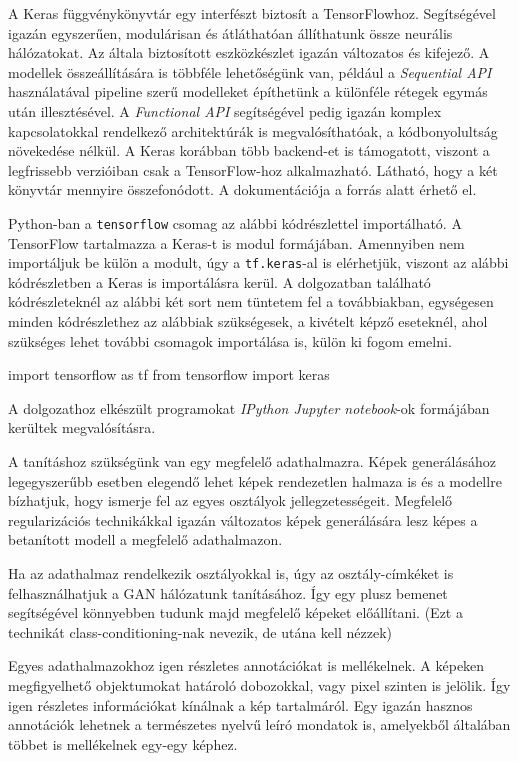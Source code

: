 A Keras függvénykönyvtár egy interfészt biztosít a TensorFlowhoz. Segítségével igazán egyszerűen, modulárisan és átláthatóan állíthatunk össze neurális hálózatokat. Az általa biztosított eszközkészlet igazán változatos és kifejező. A modellek összeállítására is többféle lehetőségünk van, például a \textit{Sequential API} használatával pipeline szerű modelleket építhetünk a különféle rétegek egymás után illesztésével. A \textit{Functional API} segítségével pedig igazán komplex kapcsolatokkal rendelkező architektúrák is megvalósíthatóak, a kódbonyolultság növekedése nélkül. A Keras korábban több backend-et is támogatott, viszont a legfrissebb verzióiban csak a TensorFlow-hoz alkalmazható. Látható, hogy a két könyvtár mennyire összefonódott. A dokumentációja a \cite{keras} forrás alatt érhető el.

Python-ban a \texttt{tensorflow} csomag az alábbi kódrészlettel importálható. A TensorFlow tartalmazza a Keras-t is modul formájában. Amennyiben nem importáljuk be külön a modult, úgy a \texttt{tf.keras}-al is elérhetjük, viszont az alábbi kódrészletben a Keras is importálásra kerül. A dolgozatban található kódrészleteknél az alábbi két sort nem tüntetem fel a továbbiakban, egységesen minden kódrészlethez az alábbiak szükségesek, a kivételt képző eseteknél, ahol szükséges lehet további csomagok importálása is, külön ki fogom emelni.
\begin{python}
import tensorflow as tf
from tensorflow import keras
\end{python}

A dolgozathoz elkészült programokat \textit{IPython Jupyter notebook}-ok \cite{jupyter} formájában kerültek megvalósításra.


A tanításhoz szükségünk van egy megfelelő adathalmazra. Képek generálásához legegyszerűbb esetben elegendő lehet képek rendezetlen halmaza is és a modellre bízhatjuk, hogy ismerje fel az egyes osztályok jellegzetességeit. Megfelelő regularizációs technikákkal igazán változatos képek generálására lesz képes a betanított modell a megfelelő adathalmazon.

Ha az adathalmaz rendelkezik osztályokkal is, úgy az osztály-címkéket is felhasználhatjuk a GAN hálózatunk tanításához. Így egy plusz bemenet segítségével könnyebben tudunk majd megfelelő képeket előállítani. (Ezt a technikát class-conditioning-nak nevezik, de utána kell nézzek)

Egyes adathalmazokhoz igen részletes annotációkat is mellékelnek. A képeken megfigyelhető objektumokat határoló dobozokkal, vagy pixel szinten is jelölik. Így igen részletes információkat kínálnak a kép tartalmáról. Egy igazán hasznos annotációk lehetnek a természetes nyelvű leíró mondatok is, amelyekből általában többet is mellékelnek egy-egy képhez.

